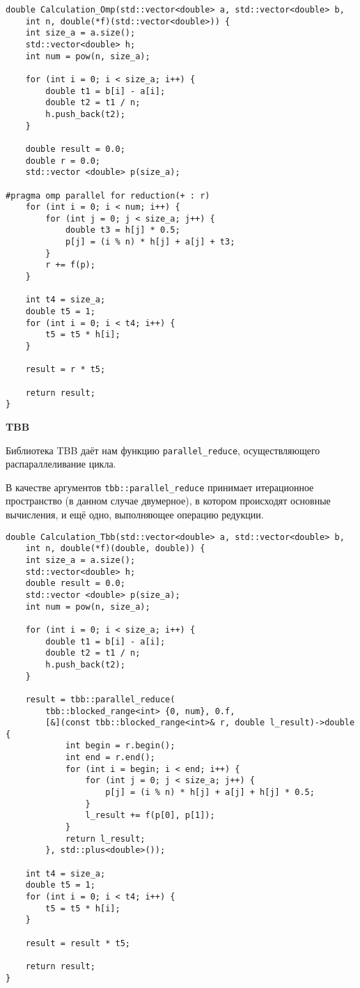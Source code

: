 \documentclass{report}
\begin{document}
\begin{lstlisting}
double Calculation_Omp(std::vector<double> a, std::vector<double> b,
    int n, double(*f)(std::vector<double>)) {
    int size_a = a.size();
    std::vector<double> h;
    int num = pow(n, size_a);

    for (int i = 0; i < size_a; i++) {
        double t1 = b[i] - a[i];
        double t2 = t1 / n;
        h.push_back(t2);
    }

    double result = 0.0;
    double r = 0.0;
    std::vector <double> p(size_a);

#pragma omp parallel for reduction(+ : r)
    for (int i = 0; i < num; i++) {
        for (int j = 0; j < size_a; j++) {
            double t3 = h[j] * 0.5;
            p[j] = (i % n) * h[j] + a[j] + t3;
        }
        r += f(p);
    }

    int t4 = size_a;
    double t5 = 1;
    for (int i = 0; i < t4; i++) {
        t5 = t5 * h[i];
    }

    result = r * t5;

    return result;
}
\end{lstlisting}
\newpage
\textbf{TBB}
\par Библиотека TBB даёт нам функцию \verb|parallel_reduce|, осуществляющего распараллеливание цикла.
\par В качестве аргументов \verb|tbb::parallel_reduce| принимает итерационное пространство (в данном случае двумерное), в котором происходят основные вычисления, и ещё одно, выполняющее операцию редукции.
\vspace{10pt}
\begin{lstlisting}
double Calculation_Tbb(std::vector<double> a, std::vector<double> b,
    int n, double(*f)(double, double)) {
    int size_a = a.size();
    std::vector<double> h;
    double result = 0.0;
    std::vector <double> p(size_a);
    int num = pow(n, size_a);

    for (int i = 0; i < size_a; i++) {
        double t1 = b[i] - a[i];
        double t2 = t1 / n;
        h.push_back(t2);
    }

    result = tbb::parallel_reduce(
        tbb::blocked_range<int> {0, num}, 0.f,
        [&](const tbb::blocked_range<int>& r, double l_result)->double {
            int begin = r.begin();
            int end = r.end();
            for (int i = begin; i < end; i++) {
                for (int j = 0; j < size_a; j++) {
                    p[j] = (i % n) * h[j] + a[j] + h[j] * 0.5;
                }
                l_result += f(p[0], p[1]);
            }
            return l_result;
        }, std::plus<double>());

    int t4 = size_a;
    double t5 = 1;
    for (int i = 0; i < t4; i++) {
        t5 = t5 * h[i];
    }

    result = result * t5;

    return result;
}
\end{lstlisting}
\newpage
\end{document}
